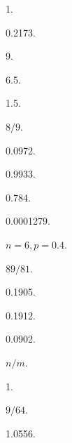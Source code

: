 \begin{answer}
  \item 1.
  \item 0.2173.
  \item 9.
  \item 6.5.
  \item 1.5.
  \setcounter{enumi}{10}
  \item $8/9$.
\end{answer}

\begin{answer}
  \item 0.0972.
  \item 0.9933.
  \item 0.784.
  \item 0.0001279.
  \item $n=6,p=0.4$.
  \item $89/81$.
  \item \begin{enumerate*}
    \item 0.1905.
    \item 0.1912.
  \end{enumerate*}
  \item 0.0902.
  \item $n/m$.
  \item 1.
  \item $9/64$.
  \item 1.0556.
\end{answer}

